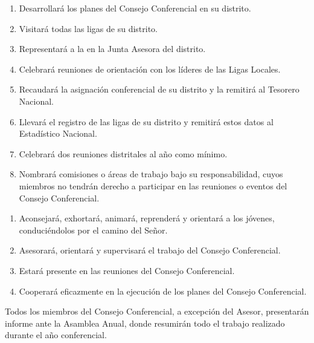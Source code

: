 \begin{enumerate}
    \item Desarrollará los planes del Consejo Conferencial en su distrito.
    \item Visitará todas las ligas de su distrito.
    \item Representará a la \LMJ{} en la Junta Asesora del distrito.
    \item Celebrará reuniones de orientación con los líderes de las Ligas Locales.
    \item Recaudará la asignación conferencial de su distrito y la remitirá al Tesorero Nacional.
    \item Llevará el registro de las ligas de su distrito y remitirá estos datos al Estadístico Nacional.
    \item Celebrará dos reuniones distritales al año como mínimo.
    \item Nombrará comisiones o áreas de trabajo bajo su responsabilidad, cuyos miembros no tendrán derecho a participar en las reuniones o eventos del Consejo Conferencial.
\end{enumerate}

\begin{enumerate}
    \item Aconsejará, exhortará, animará, reprenderá y orientará a los jóvenes, conduciéndolos por el camino del Señor.
    \item Asesorará, orientará y supervisará el trabajo del Consejo Conferencial.
    \item Estará presente en las reuniones del Consejo Conferencial.
    \item Cooperará eficazmente en la ejecución de los planes del Consejo Conferencial.
\end{enumerate}

\article
\label{informes-consejo}
Todos los miembros del Consejo Conferencial, a excepción del Asesor, presentarán informe ante la Asamblea Anual, donde resumirán todo el trabajo realizado durante el año conferencial.
